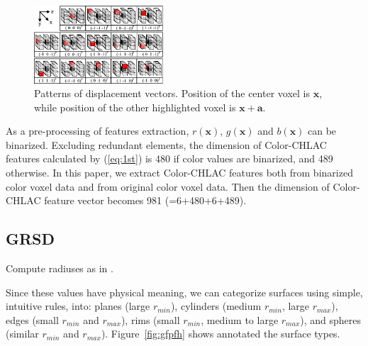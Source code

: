 \documentclass[conference]{sty/IEEEtran}
\begin{document}
\begin{figure}[htb!]
  \begin{center}
    \includegraphics[width=0.43\textwidth]{figures/colorCHLAC/displacement_vectors.png}
    \caption{Patterns of displacement vectors. Position of the center voxel is ${\bm x}$, 
      while position of the other highlighted voxel is ${\bm x}+{\bm a}$. }
    \label{fig:displacement_vectors}
  \end{center}
\end{figure}

As a pre-processing of features extraction, $r(\bm{x})$, $g(\bm{x})$ and $b(\bm{x})$ can be binarized. 
Excluding redundant elements, the dimension of Color-CHLAC features calculated by (\ref{eq:1st}) is 
    480 if color values are binarized, and 489 otherwise.
In this paper, we extract Color-CHLAC features both from binarized color voxel data and from original color voxel data. 
Then the dimension of Color-CHLAC feature vector becomes 981 (=6+480+6+489). 


\subsection{GRSD}
Compute radiuses as in \cite{Marton10CAD}.

Since these values have physical meaning, we can categorize surfaces using
simple, intuitive rules, into: planes (large $r_{min}$), cylinders (medium $r_{min}$,
large $r_{max}$), edges (small $r_{min}$ and $r_{max}$), rims (small $r_{min}$,
medium to large $r_{max}$), and spheres (similar $r_{min}$ and $r_{max}$).
Figure~\ref{fig:gfpfh} shows annotated the surface types.
\end{document}

